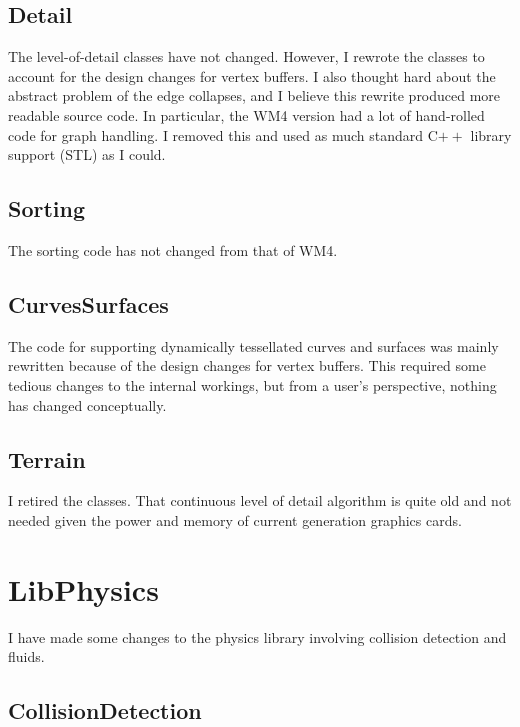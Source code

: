 \documentclass{article}
\begin{document}
\subsection{Detail}

The level-of-detail classes have not changed.  However, I rewrote the
 classes to account for the design changes for
vertex buffers.  I also thought hard about the abstract problem of
the edge collapses, and I believe this rewrite produced more
readable source code.  In particular, the WM4 version had a lot of
hand-rolled code for graph handling.  I removed this and used as much
standard C$++$ library support (STL) as I could.

\subsection{Sorting}

The sorting code has not changed from that of WM4.

\subsection{CurvesSurfaces}

The code for supporting dynamically tessellated curves and surfaces was
mainly rewritten because of the design changes for vertex buffers.  This
required some tedious changes to the internal workings, but from a
user's perspective, nothing has changed conceptually.

\subsection{Terrain}

I retired the  classes.  That continuous level of
detail algorithm is quite old and not needed given the power and
memory of current generation graphics cards.

\section{LibPhysics}

I have made some changes to the physics library involving collision detection
and fluids.

\subsection{CollisionDetection}
\end{document}
